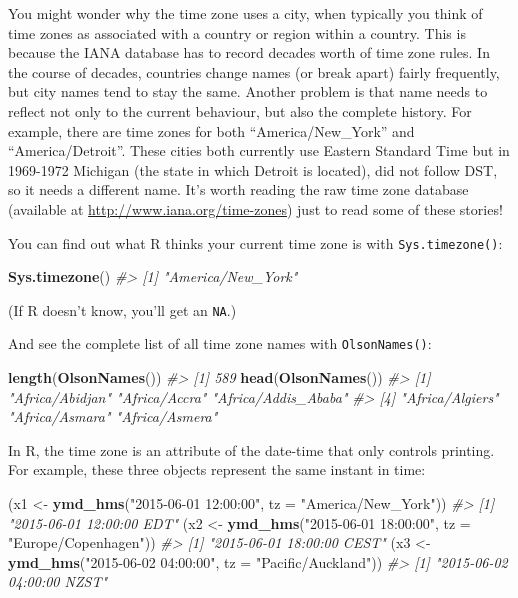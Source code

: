 \documentclass[]{book}
\newenvironment{Shaded}{\begin{snugshade}}{\end{snugshade}}
\newcommand{\KeywordTok}[1]{\textcolor[rgb]{0.13,0.29,0.53}{\textbf{{#1}}}}
\newcommand{\DataTypeTok}[1]{\textcolor[rgb]{0.13,0.29,0.53}{{#1}}}
\newcommand{\StringTok}[1]{\textcolor[rgb]{0.31,0.60,0.02}{{#1}}}
\newcommand{\CommentTok}[1]{\textcolor[rgb]{0.56,0.35,0.01}{\textit{{#1}}}}
\newcommand{\NormalTok}[1]{{#1}}
\begin{document}
You might wonder why the time zone uses a city, when typically you think
of time zones as associated with a country or region within a country.
This is because the IANA database has to record decades worth of time
zone rules. In the course of decades, countries change names (or break
apart) fairly frequently, but city names tend to stay the same. Another
problem is that name needs to reflect not only to the current behaviour,
but also the complete history. For example, there are time zones for
both ``America/New\_York'' and ``America/Detroit''. These cities both
currently use Eastern Standard Time but in 1969-1972 Michigan (the state
in which Detroit is located), did not follow DST, so it needs a
different name. It's worth reading the raw time zone database (available
at \url{http://www.iana.org/time-zones}) just to read some of these
stories!

You can find out what R thinks your current time zone is with
\texttt{Sys.timezone()}:

\begin{Shaded}
\begin{Highlighting}[]
\KeywordTok{Sys.timezone}\NormalTok{()}
\CommentTok{#> [1] "America/New_York"}
\end{Highlighting}
\end{Shaded}

(If R doesn't know, you'll get an \texttt{NA}.)

And see the complete list of all time zone names with
\texttt{OlsonNames()}:

\begin{Shaded}
\begin{Highlighting}[]
\KeywordTok{length}\NormalTok{(}\KeywordTok{OlsonNames}\NormalTok{())}
\CommentTok{#> [1] 589}
\KeywordTok{head}\NormalTok{(}\KeywordTok{OlsonNames}\NormalTok{())}
\CommentTok{#> [1] "Africa/Abidjan"     "Africa/Accra"       "Africa/Addis_Ababa"}
\CommentTok{#> [4] "Africa/Algiers"     "Africa/Asmara"      "Africa/Asmera"}
\end{Highlighting}
\end{Shaded}

In R, the time zone is an attribute of the date-time that only controls
printing. For example, these three objects represent the same instant in
time:

\begin{Shaded}
\begin{Highlighting}[]
\NormalTok{(x1 <-}\StringTok{ }\KeywordTok{ymd_hms}\NormalTok{(}\StringTok{"2015-06-01 12:00:00"}\NormalTok{, }\DataTypeTok{tz =} \StringTok{"America/New_York"}\NormalTok{))}
\CommentTok{#> [1] "2015-06-01 12:00:00 EDT"}
\NormalTok{(x2 <-}\StringTok{ }\KeywordTok{ymd_hms}\NormalTok{(}\StringTok{"2015-06-01 18:00:00"}\NormalTok{, }\DataTypeTok{tz =} \StringTok{"Europe/Copenhagen"}\NormalTok{))}
\CommentTok{#> [1] "2015-06-01 18:00:00 CEST"}
\NormalTok{(x3 <-}\StringTok{ }\KeywordTok{ymd_hms}\NormalTok{(}\StringTok{"2015-06-02 04:00:00"}\NormalTok{, }\DataTypeTok{tz =} \StringTok{"Pacific/Auckland"}\NormalTok{))}
\CommentTok{#> [1] "2015-06-02 04:00:00 NZST"}
\end{Highlighting}
\end{Shaded}
\end{document}
